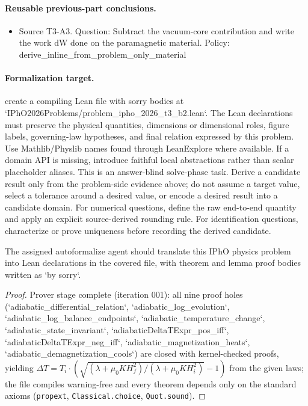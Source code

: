 \paragraph{Reusable previous-part conclusions.}
\begin{itemize}
\item Source T3-A3. Question: Subtract the vacuum-core contribution and write the work dW done on the paramagnetic material. Policy: derive\_inline\_from\_problem\_only\_material
\end{itemize}

\paragraph{Formalization target.}
create a compiling Lean file with sorry bodies at `IPhO2026Problems/problem\_ipho\_2026\_t3\_b2.lean`.
The Lean declarations must preserve the physical quantities, dimensions or dimensional roles, figure labels, governing-law hypotheses, and final relation expressed by this problem.
Use Mathlib/Physlib names found through LeanExplore where available. If a domain API is missing, introduce faithful local abstractions rather than scalar placeholder aliases.
This is an answer-blind solve-phase task. Derive a candidate result only from the problem-side evidence above; do not assume a target value, select a tolerance around a desired value, or encode a desired result into a candidate domain.
For numerical questions, define the raw end-to-end quantity and apply an explicit source-derived rounding rule. For identification questions, characterize or prove uniqueness before recording the derived candidate.

\begin{theorem}
\label{thm:physics:ipho_2026_t3_b2:target}
\leanok
The assigned autoformalize agent should translate this IPhO physics problem into Lean declarations in the covered file, with theorem and lemma proof bodies written as `by sorry`.
\end{theorem}
\begin{proof}
\leanok
Prover stage complete (iteration 001): all nine proof holes
(`adiabatic_differential_relation`, `adiabatic_log_evolution`,
`adiabatic_log_balance_endpoints`, `adiabatic_temperature_change`,
`adiabatic_state_invariant`, `adiabaticDeltaTExpr_pos_iff`,
`adiabaticDeltaTExpr_neg_iff`, `adiabatic_magnetization_heats`,
`adiabatic_demagnetization_cools`) are closed with kernel-checked proofs,
yielding $\Delta T = T_i\cdot(\sqrt{(\lambda+\mu_0 K H_f^2)/(\lambda+\mu_0 K H_i^2)}-1)$
from the given laws; the file compiles warning-free and every theorem depends
only on the standard axioms (\texttt{propext}, \texttt{Classical.choice},
\texttt{Quot.sound}).
\end{proof}
